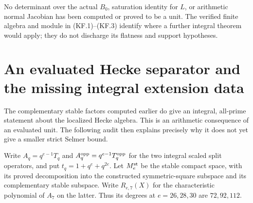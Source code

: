 \documentclass[11pt,a4paper]{article}
\theoremstyle{definition}
\begin{document}
No determinant over the actual $B_0$, saturation
identity for $L$, or arithmetic normal Jacobian has
been computed or proved to be a unit.  The verified
finite algebra and module in (KF.1)--(KF.3) identify
where a further integral theorem would apply; they
do not discharge its flatness and support hypotheses.



\section{An evaluated Hecke separator and the missing integral extension data}
\label{sec:kt-hecke-normal}

The complementary stable factors computed earlier do give an
integral, all-prime statement about the localized Hecke algebra.
This is an arithmetic consequence of an evaluated unit.  The
following audit then explains precisely why it does not yet give
a smaller strict Selmer bound.

Write $A_q=q^{e-1}T_q$ and $A_q^{\rm opp}=q^{e-1}T_q^{\rm opp}$
for the two integral scaled split operators, and put
$t_q=1+q^e+q^{2e}$.  Let $M^{\rm st}_e$ be the stable compact
space, with its proved decomposition into the constructed
symmetric-square subspace and its complementary stable subspace.
Write $R_{e,7}(X)$ for the characteristic polynomial of $A_7$
on the latter.  Thus its degrees at $e=26,28,30$ are
$72,92,112$.
\end{document}
